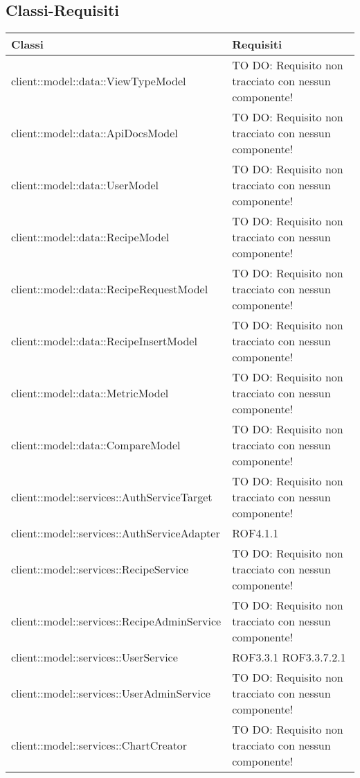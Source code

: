 \subsection{Classi-Requisiti} %
\label{sub:classi_requisiti}
\begin{center}
\def\arraystretch{1.5}
\bgroup
\begin{longtable}{| p{11cm} | p{2.5cm} |}
\hline
\textbf{Classi} & \textbf{Requisiti} \\
\hline
client::model::data::ViewTypeModel & TO DO: Requisito non tracciato con nessun componente! \\
\hline
client::model::data::ApiDocsModel & TO DO: Requisito non tracciato con nessun componente! \\
\hline
client::model::data::UserModel & TO DO: Requisito non tracciato con nessun componente! \\
\hline
client::model::data::RecipeModel & TO DO: Requisito non tracciato con nessun componente! \\
\hline
client::model::data::RecipeRequestModel & TO DO: Requisito non tracciato con nessun componente! \\
\hline
client::model::data::RecipeInsertModel & TO DO: Requisito non tracciato con nessun componente! \\
\hline
client::model::data::MetricModel & TO DO: Requisito non tracciato con nessun componente! \\
\hline
client::model::data::CompareModel & TO DO: Requisito non tracciato con nessun componente! \\
\hline
client::model::services::AuthServiceTarget & TO DO: Requisito non tracciato con nessun componente! \\
\hline
client::model::services::AuthServiceAdapter & ROF4.1.1 \\
\hline
client::model::services::RecipeService & TO DO: Requisito non tracciato con nessun componente! \\
\hline
client::model::services::RecipeAdminService & TO DO: Requisito non tracciato con nessun componente! \\
\hline
client::model::services::UserService & ROF3.3.1 \newline ROF3.3.7.2.1 \\
\hline
client::model::services::UserAdminService & TO DO: Requisito non tracciato con nessun componente! \\
\hline
client::model::services::ChartCreator & TO DO: Requisito non tracciato con nessun componente! \\

\end{longtable}
\end{center}

